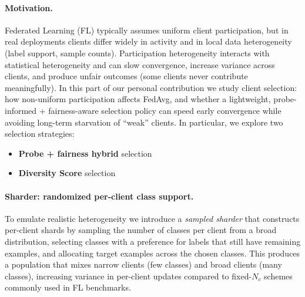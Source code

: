 \documentclass[10pt,twocolumn,letterpaper]{article}
\begin{document}
\paragraph{Motivation.}
Federated Learning (FL) typically assumes uniform client participation, but in real deployments clients differ widely in activity and in local data heterogeneity (label support, sample counts). Participation heterogeneity interacts with statistical heterogeneity and can slow convergence, increase variance across clients, and produce unfair outcomes (some clients never contribute meaningfully). In this part of our personal contribution we study client selection: how non-uniform participation affects FedAvg, and whether a lightweight, probe-informed + fairness-aware selection policy can speed early convergence while avoiding long-term starvation of ``weak'' clients. \cite{nemeth2022client,reddi2021adaptive,pfeiffer2023federated} In particular, we explore two selection strategies:
\begin{itemize}
\item\textbf{Probe + fairness hybrid} selection
\item\textbf{Diversity Score} selection
\end{itemize}


\paragraph{Sharder: randomized per-client class support.}
To emulate realistic heterogeneity we introduce a \emph{sampled sharder} that constructs per-client shards by sampling the number of classes per client from a broad distribution, selecting classes with a preference for labels that still have remaining examples, and allocating target examples across the chosen classes. This produces a population that mixes narrow clients (few classes) and broad clients (many classes), increasing variance in per-client updates compared to fixed-$N_c$ schemes commonly used in FL benchmarks.
\end{document}

